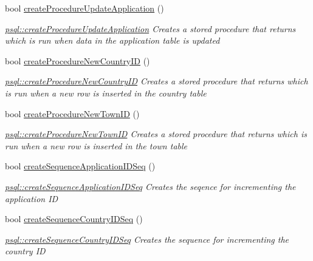\begin{DoxyCompactItemize}
bool \mbox{\hyperlink{classpsql_a28f3e3d6309e3ce57493db284c099946}{create\+Procedure\+Update\+Application}} ()
\begin{DoxyCompactList}\small\item\em \mbox{\hyperlink{classpsql_a28f3e3d6309e3ce57493db284c099946}{psql\+::create\+Procedure\+Update\+Application}} Creates a stored procedure that returns which is run when data in the application table is updated \end{DoxyCompactList}\item 
bool \mbox{\hyperlink{classpsql_a565bfc828ecb6b5621354128773494fd}{create\+Procedure\+New\+Country\+ID}} ()
\begin{DoxyCompactList}\small\item\em \mbox{\hyperlink{classpsql_a565bfc828ecb6b5621354128773494fd}{psql\+::create\+Procedure\+New\+Country\+ID}} Creates a stored procedure that returns which is run when a new row is inserted in the country table \end{DoxyCompactList}\item 
bool \mbox{\hyperlink{classpsql_ade0c7fa4f019c3f349230af09b1de49e}{create\+Procedure\+New\+Town\+ID}} ()
\begin{DoxyCompactList}\small\item\em \mbox{\hyperlink{classpsql_ade0c7fa4f019c3f349230af09b1de49e}{psql\+::create\+Procedure\+New\+Town\+ID}} Creates a stored procedure that returns which is run when a new row is inserted in the town table \end{DoxyCompactList}\item 
bool \mbox{\hyperlink{classpsql_a54c75d0896ee6aad58e22c830895c106}{create\+Sequence\+Application\+I\+D\+Seq}} ()
\begin{DoxyCompactList}\small\item\em \mbox{\hyperlink{classpsql_a54c75d0896ee6aad58e22c830895c106}{psql\+::create\+Sequence\+Application\+I\+D\+Seq}} Creates the seqence for incrementing the application ID \end{DoxyCompactList}\item 
bool \mbox{\hyperlink{classpsql_aa907c84f592212451d3d59a2061adabd}{create\+Sequence\+Country\+I\+D\+Seq}} ()
\begin{DoxyCompactList}\small\item\em \mbox{\hyperlink{classpsql_aa907c84f592212451d3d59a2061adabd}{psql\+::create\+Sequence\+Country\+I\+D\+Seq}} Creates the sequence for incrementing the country ID \end{DoxyCompactList}\item 

\end{DoxyCompactItemize}
